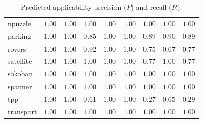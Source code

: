 \begin{table}[t]
{\begin{tabular}{|l|cccc|cccc|}
npuzzle & $\mathbf{1.00}$ & $\mathbf{1.00}$ & $\mathbf{1.00}$ & $\mathbf{1.00}$ & $\mathbf{1.00}$ & $\mathbf{1.00}$ & $\mathbf{1.00}$ & $\mathbf{1.00}$ \\
parking & $\mathbf{1.00}$ & $\mathbf{1.00}$ & $0.85$ & $\mathbf{1.00}$ & $\mathbf{1.00}$ & $0.89$ & $0.90$ & $0.89$ \\
rovers & $\mathbf{1.00}$ & $\mathbf{1.00}$ & $0.92$ & $\mathbf{1.00}$ & $\mathbf{1.00}$ & $0.75$ & $0.67$ & $0.77$ \\
satellite & $\mathbf{1.00}$ & $\mathbf{1.00}$ & $\mathbf{1.00}$ & $\mathbf{1.00}$ & $\mathbf{1.00}$ & $0.77$ & $\mathbf{1.00}$ & $0.77$ \\
sokoban & $\mathbf{1.00}$ & $\mathbf{1.00}$ & $\mathbf{1.00}$ & $\mathbf{1.00}$ & $\mathbf{1.00}$ & $\mathbf{1.00}$ & $\mathbf{1.00}$ & $\mathbf{1.00}$ \\
spanner & $\mathbf{1.00}$ & $\mathbf{1.00}$ & $\mathbf{1.00}$ & $\mathbf{1.00}$ & $\mathbf{1.00}$ & $\mathbf{1.00}$ & $\mathbf{1.00}$ & $\mathbf{1.00}$ \\
tpp & $\mathbf{1.00}$ & $\mathbf{1.00}$ & $0.61$ & $\mathbf{1.00}$ & $\mathbf{1.00}$ & $0.27$ & $0.65$ & $0.29$ \\
transport & $\mathbf{1.00}$ & $\mathbf{1.00}$ & $\mathbf{1.00}$ & $\mathbf{1.00}$ & $\mathbf{1.00}$ & $\mathbf{1.00}$ & $\mathbf{1.00}$ & $\mathbf{1.00}$ \\
\hline
\end{tabular}
}
\caption{\small{Predicted applicability precision ($P$) and recall ($R$).}}
\label{tab:applicability}
\end{table}
